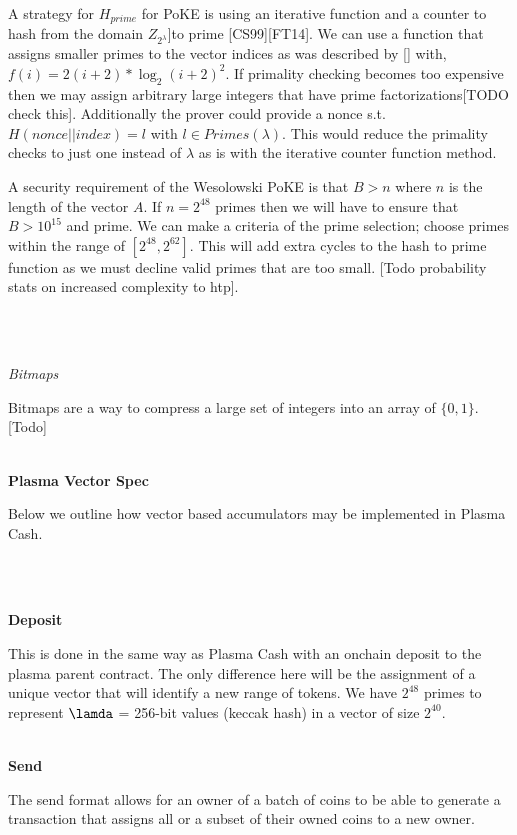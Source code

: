 \documentclass[11pt]{article}
\begin{document}
A strategy for $H_{prime}$ for PoKE is using an iterative function and a counter to hash from the domain $Z_{2^{\lambda}}$]to prime [CS99][FT14]. We can use a function that assigns smaller primes to the vector indices as was described by [] with, $f(i)=2(i+2)* \log_2(i+2)^2$. If primality checking becomes too expensive then we may assign arbitrary large integers that have prime factorizations[TODO check this]. Additionally the prover could provide a nonce s.t. $H(nonce||index)=l$ with $l \in Primes(\lambda)$. This would reduce the primality checks to just one instead of $\lambda$ as is with the iterative counter function method.

A security requirement of the Wesolowski PoKE is that $B > n$ where $n$ is the length of the vector $A$. If $n=2^{48}$ primes then we will have to ensure that $B > 10^{15}$ and prime. We can make a criteria of the prime selection; choose primes within the range of $[2^{48}, 2^{62}]$. This will add extra cycles to the hash to prime function as we must decline valid primes that are too small. [Todo probability stats on increased complexity to htp].

\\
\\
\centerline{\textit{Bitmaps}}

Bitmaps are a way to compress a large set of integers into an array of $\{0,1\}$. [Todo]
\\
\\

\centerline{\textbf{Plasma Vector Spec}}

Below we outline how vector based accumulators may be implemented in Plasma Cash.

\\
\\
\centerline{\textbf{Deposit}}

This is done in the same way as Plasma Cash with an onchain deposit to the plasma parent contract. The only difference here will be the assignment of a unique vector that will identify a new range of tokens. We have $2^{48}$ primes to represent $\lamda$ = 256-bit values (keccak hash) in a vector of size $2^{40}$. 
\\
\\

\centerline{\textbf{Send}}

The send format allows for an owner of a batch of coins to be able to generate a transaction that assigns all or a subset of their owned coins to a new owner. 
\end{document}
